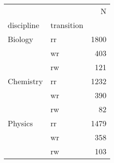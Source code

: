 \begin{tabular}{llr}
\toprule
        &    &     N \\
discipline & transition &       \\
\midrule
Biology & rr &  1800 \\
        & wr &   403 \\
        & rw &   121 \\
Chemistry & rr &  1232 \\
        & wr &   390 \\
        & rw &    82 \\
Physics & rr &  1479 \\
        & wr &   358 \\
        & rw &   103 \\
\bottomrule
\end{tabular}
